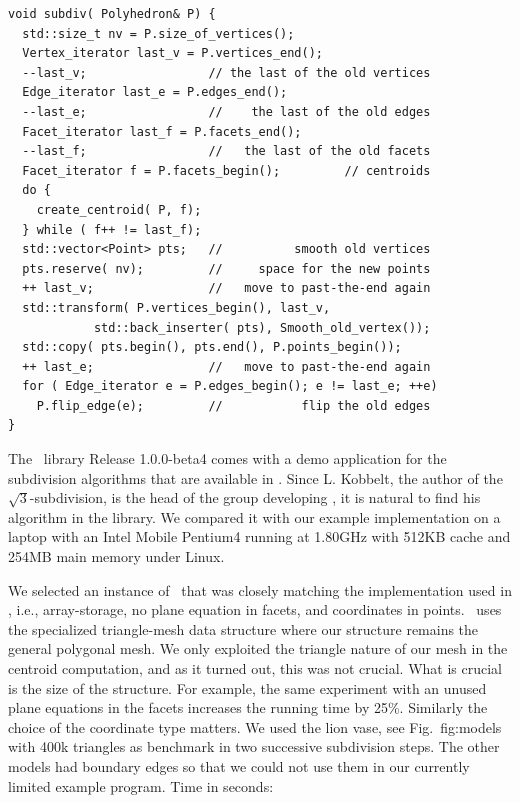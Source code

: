 \begin{lstlisting}
void subdiv( Polyhedron& P) {
  std::size_t nv = P.size_of_vertices();
  Vertex_iterator last_v = P.vertices_end();
  --last_v;                 // the last of the old vertices
  Edge_iterator last_e = P.edges_end();
  --last_e;                 //    the last of the old edges
  Facet_iterator last_f = P.facets_end();
  --last_f;                 //   the last of the old facets
  Facet_iterator f = P.facets_begin();         // centroids
  do {
    create_centroid( P, f);
  } while ( f++ != last_f);
  std::vector<Point> pts;   //          smooth old vertices
  pts.reserve( nv);         //     space for the new points
  ++ last_v;                //   move to past-the-end again
  std::transform( P.vertices_begin(), last_v, 
            std::back_inserter( pts), Smooth_old_vertex());
  std::copy( pts.begin(), pts.end(), P.points_begin());
  ++ last_e;                //   move to past-the-end again
  for ( Edge_iterator e = P.edges_begin(); e != last_e; ++e)
    P.flip_edge(e);         //           flip the old edges
}
\end{lstlisting}%

\noindent
The \openmesh\ library Release 1.0.0-beta4 comes with a demo
application for the subdivision algorithms that are available in
\openmesh. Since L.  Kobbelt, the author of the
$\sqrt{3}$-subdivision, is the head of the group developing \openmesh,
it is natural to find his algorithm in the library. We compared it
with our example implementation on a laptop with an Intel Mobile
Pentium4 running at 1.80GHz with 512KB cache and 254MB main memory
under Linux.

We selected an instance of \cgalpoly\ that was closely matching the
implementation used in \openmesh, i.e., array-storage, no plane
equation in facets, and  coordinates in
points. \openmesh\ uses the specialized triangle-mesh data structure
where our structure remains the general polygonal mesh. We only
exploited the triangle nature of our mesh in the centroid computation,
and as it turned out, this was not crucial.  What is crucial is the
size of the structure. For example, the same experiment with an unused
plane equations in the facets increases the running time by
25\%. Similarly the choice of the coordinate type matters. We used the
lion vase, see Fig.~{fig:models} with 400k triangles as benchmark in
two successive subdivision steps. The other models had boundary edges
so that we could not use them in our currently limited example
program. Time in seconds:

